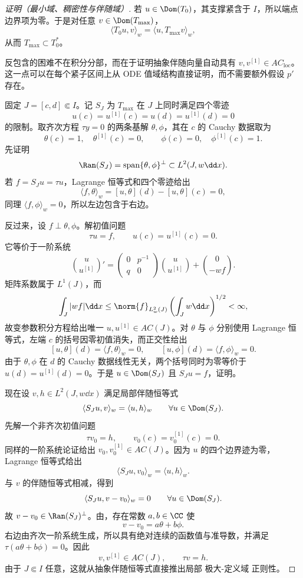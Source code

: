 \begin{proof}[证明（最小域、稠密性与伴随域）]
若 $u\in\Dom(T_0)$，其支撑紧含于 $I$，所以端点边界项为零。于是对任意 $v\in\Dom(T_{\max})$，
\[
 \langle T_0u,v\rangle_w=\langle u,T_{\max}v\rangle_w,
\]
从而 $T_{\max}\subset T_0^*$。

反包含的困难不在积分分部，而在于证明抽象伴随向量自动具有 $v,v^{[1]}\in AC_{\mathrm{loc}}$。这一点可以在每个紧子区间上从 ODE 值域结构直接证明，而不需要额外假设 $p'$ 存在。

固定 $J=[c,d]\Subset I$。记 $S_J$ 为 $T_{\max}$ 在 $J$ 上同时满足四个零迹
\[
 u(c)=u^{[1]}(c)=u(d)=u^{[1]}(d)=0
\]
的限制。取齐次方程 $\tau y=0$ 的两条基解 $\theta,\phi$，其在 $c$ 的 Cauchy 数据取为
\[
 \theta(c)=1,\quad\theta^{[1]}(c)=0,
 \qquad
 \phi(c)=0,\quad\phi^{[1]}(c)=1.
\]
先证明
\begin{equation}\label{eq:math-sl-local-min-range}
 \Ran(S_J)
 =\operatorname{span}\{\theta,\phi\}^{\perp}
 \subset L^2(J,w\dd x).
\end{equation}
若 $f=S_Ju=\tau u$，Lagrange 恒等式和四个零迹给出
\[
 \langle f,\theta\rangle_w
 =[u,\theta](d)-[u,\theta](c)=0,
\]
同理 $\langle f,\phi\rangle_w=0$，所以左边包含于右边。

反过来，设 $f\perp\theta,\phi$。解初值问题
\[
 \tau u=f,
 \qquad u(c)=u^{[1]}(c)=0.
\]
它等价于一阶系统
\[
 \binom{u}{u^{[1]}}'
 =\begin{pmatrix}0&p^{-1}\\q&0\end{pmatrix}
 \binom{u}{u^{[1]}}
 +\binom{0}{-wf}.
\]
矩阵系数属于 $L^1(J)$，而
\[
 \int_J|wf|\dd x
 \le\norm{f}_{L^2_w(J)}\left(\int_Jw\dd x\right)^{1/2}<\infty,
\]
故变参数积分方程给出唯一 $u,u^{[1]}\in AC(J)$。对 $\theta$ 与 $\phi$ 分别使用 Lagrange 恒等式，左端 $c$ 的括号因零初值消失，而正交性给出
\[
 [u,\theta](d)=\langle f,\theta\rangle_w=0,
 \qquad
 [u,\phi](d)=\langle f,\phi\rangle_w=0.
\]
由于 $\theta,\phi$ 在 $d$ 的 Cauchy 数据线性无关，两个括号同时为零等价于
$u(d)=u^{[1]}(d)=0$。于是 $u\in\Dom(S_J)$ 且 $S_Ju=f$，证明。

现在设 $v,h\in L^2(J,w\dd x)$ 满足局部伴随恒等式
\[
 \langle S_Ju,v\rangle_w=\langle u,h\rangle_w
 \qquad\forall u\in\Dom(S_J).
\]
先解一个非齐次初值问题
\[
 \tau v_0=h,
 \qquad v_0(c)=v_0^{[1]}(c)=0.
\]
同样的一阶系统论证给出 $v_0,v_0^{[1]}\in AC(J)$。因为 $u$ 的四个边界迹为零，Lagrange 恒等式给出
\[
 \langle S_Ju,v_0\rangle_w=\langle u,h\rangle_w.
\]
与 $v$ 的伴随恒等式相减，得到
\[
 \langle S_Ju,v-v_0\rangle_w=0
 \qquad\forall u\in\Dom(S_J).
\]
故 $v-v_0\in\Ran(S_J)^\perp$。由，存在常数 $a,b\in\CC$ 使
\[
 v-v_0=a\theta+b\phi.
\]
右边由齐次一阶系统生成，所以具有绝对连续的函数值与准导数，并满足 $\tau(a\theta+b\phi)=0$。因此
\[
 v,v^{[1]}\in AC(J),
 \qquad \tau v=h.
\]
由于 $J\Subset I$ 任意，这就从抽象伴随恒等式直接推出局部 极大-定义域 正则性。


\end{proof}
